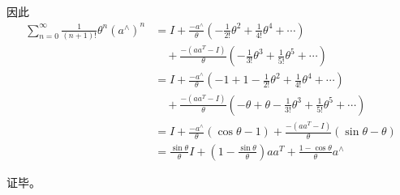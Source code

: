\documentclass[utf8]{ctexart}
\begin{document}
        因此\[\begin{aligned}
            \sum\limits_{n=0}^{\infty}\frac{1}{(n+1)!}\theta^n (a^\wedge)^n
            &=I+\frac{-a^\wedge}{\theta}(-\frac{1}{2!}\theta^2+\frac{1}{4!}\theta^4+\cdots)\\
            &\quad+\frac{-(aa^T-I)}{\theta}(-\frac{1}{3!}\theta^3+\frac{1}{5!}\theta^5+\cdots)\\
            &=I+\frac{-a^\wedge}{\theta}(-1+1-\frac{1}{2!}\theta^2+\frac{1}{4!}\theta^4+\cdots)\\
            &\quad+\frac{-(aa^T-I)}{\theta}(-\theta+\theta-\frac{1}{3!}\theta^3+\frac{1}{5!}\theta^5+\cdots)\\
            &=I+\frac{-a^\wedge}{\theta}(\cos\theta -1)+\frac{-(aa^T-I)}{\theta}(\sin\theta-\theta)\\
            &=\frac{\sin\theta}{\theta}I+\left(1-\frac{\sin\theta}{\theta}\right)aa^T+\frac{1-\cos\theta}{\theta}a^\wedge
        \end{aligned}\]

        证毕。
        
\end{document}
